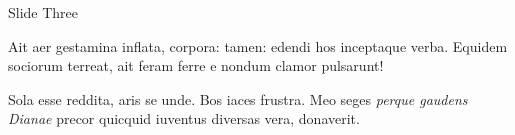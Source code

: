 \documentclass[ignorenonframetext,,aspectratio=169,14pt]{beamer}
\begin{document}
\begin{frame}{Slide Three}

Ait aer gestamina inflata, corpora: tamen: edendi hos inceptaque verba.
Equidem sociorum terreat, ait feram ferre e nondum clamor pulsarunt!

Sola esse reddita, aris se unde. Bos iaces frustra. Meo seges
\emph{perque gaudens Dianae} precor quicquid iuventus diversas vera,
donaverit.

\end{frame}
\end{document}

